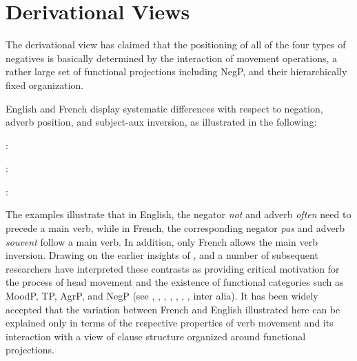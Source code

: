 \documentclass[output=paper]{langsci/langscibook}
\begin{document}
{\section{Derivational Views}

The derivational view has claimed that the positioning of all of the
four types of negatives is basically determined by the interaction of movement
operations, a rather large set of functional projections including NegP,
and their hierarchically fixed organization.


English and French display systematic differences with respect
to negation, adverb position, and subject-aux inversion, as illustrated
in the following:
%


\bigskip

:

\eal\label{exe:1}
\zl

\eal
{}
\zl

:

\eal
{}
\zl

\eal
{}
\zl

:

\eal
{}
\zl


\eal
{}
\zl




The examples illustrate that in English, the negator \emph{not}
and adverb \emph{often} need to precede a main verb, while in French,
the corresponding negator \textit{pas} and adverb \textit{souvent} follow
a main verb. In addition, only French allows the main verb inversion.
Drawing on the earlier insights of \citet{Emonds:78},
\citet{Pollock:89,Pollock:94} and a number of subsequent researchers
have interpreted these contrasts as providing critical motivation for
the process of head movement and the existence of functional
categories such as MoodP, TP, AgrP, and NegP (see \citet{Belletti:90}, \citet{Zanuttini:91,Zanuttini:97,Zanuttini:01}, \citet{Chomsky:91,Chomsky:93,Chomsky:95}, \citet{Lasnik:95}, \citet{Haegeman:95,Haegeman:97}, \citet{Vikner:97}, \citet{Zeijlstra:15}, inter alia).
It has been widely
accepted that the variation between French and English illustrated
here can be explained only in terms of the respective properties
of verb movement and its interaction with a view of clause
structure organized around functional projections.

}
\end{document}
